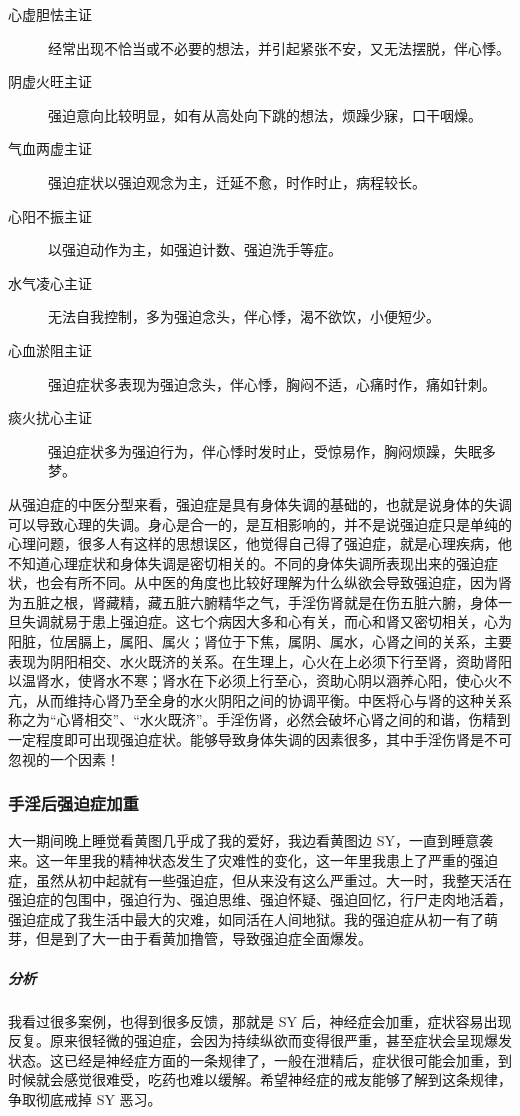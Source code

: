 \begin{description}
    \item[心虚胆怯主证] 经常出现不恰当或不必要的想法，并引起紧张不安，又无法摆脱，伴心悸。
    \item[阴虚火旺主证] 强迫意向比较明显，如有从高处向下跳的想法，烦躁少寐，口干咽燥。
    \item[气血两虚主证] 强迫症状以强迫观念为主，迁延不愈，时作时止，病程较长。
    \item[心阳不振主证] 以强迫动作为主，如强迫计数、强迫洗手等症。
    \item[水气凌心主证] 无法自我控制，多为强迫念头，伴心悸，渴不欲饮，小便短少。
    \item[心血淤阻主证] 强迫症状多表现为强迫念头，伴心悸，胸闷不适，心痛时作，痛如针刺。
    \item[痰火扰心主证] 强迫症状多为强迫行为，伴心悸时发时止，受惊易作，胸闷烦躁，失眠多梦。
\end{description}

从强迫症的中医分型来看，强迫症是具有身体失调的基础的，也就是说身体的失调可以导致心理的失调。身心是合一的，是互相影响的，并不是说强迫症只是单纯的心理问题，很多人有这样的思想误区，他觉得自己得了强迫症，就是心理疾病，他不知道心理症状和身体失调是密切相关的。不同的身体失调所表现出来的强迫症状，也会有所不同。从中医的角度也比较好理解为什么纵欲会导致强迫症，因为肾为五脏之根，肾藏精，藏五脏六腑精华之气，手淫伤肾就是在伤五脏六腑，身体一旦失调就易于患上强迫症。这七个病因大多和心有关，而心和肾又密切相关，心为阳脏，位居膈上，属阳、属火；肾位于下焦，属阴、属水，心肾之间的关系，主要表现为阴阳相交、水火既济的关系。在生理上，心火在上必须下行至肾，资助肾阳以温肾水，使肾水不寒；肾水在下必须上行至心，资助心阴以涵养心阳，使心火不亢，从而维持心肾乃至全身的水火阴阳之间的协调平衡。中医将心与肾的这种关系称之为“心肾相交”、“水火既济”。手淫伤肾，必然会破坏心肾之间的和谐，伤精到一定程度即可出现强迫症状。能够导致身体失调的因素很多，其中手淫伤肾是不可忽视的一个因素！

\subsubsection{手淫后强迫症加重}

\begin{case}[强迫症]
    大一期间晚上睡觉看黄图几乎成了我的爱好，我边看黄图边 SY，一直到睡意袭来。这一年里我的精神状态发生了灾难性的变化，这一年里我患上了严重的强迫症，虽然从初中起就有一些强迫症，但从来没有这么严重过。大一时，我整天活在强迫症的包围中，强迫行为、强迫思维、强迫怀疑、强迫回忆，行尸走肉地活着，强迫症成了我生活中最大的灾难，如同活在人间地狱。我的强迫症从初一有了萌芽，但是到了大一由于看黄加撸管，导致强迫症全面爆发。
    \subparagraph{分析} 我看过很多案例，也得到很多反馈，那就是 SY 后，神经症会加重，症状容易出现反复。原来很轻微的强迫症，会因为持续纵欲而变得很严重，甚至症状会呈现爆发状态。这已经是神经症方面的一条规律了，一般在泄精后，症状很可能会加重，到时候就会感觉很难受，吃药也难以缓解。希望神经症的戒友能够了解到这条规律，争取彻底戒掉 SY 恶习。
\end{case}


